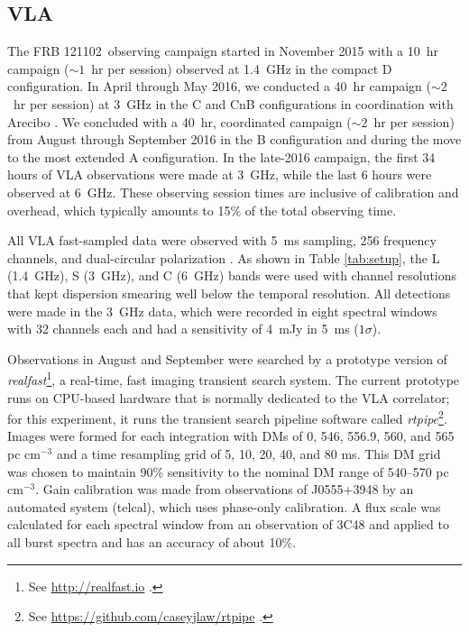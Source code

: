 \documentclass[twocolumn]{aastex61}
\newcommand{\frb}{FRB 121102}
\begin{document}
\subsection{VLA}

The \frb\ observing campaign started in November 2015 with a 10~hr campaign ($\sim1$~hr per session) observed at 1.4~GHz in the compact D configuration. In April through May 2016, we conducted a 40~hr campaign ($\sim2$~hr per session) at 3~GHz in the C and CnB configurations in coordination with Arecibo \citep{2016arXiv160308880S}. We concluded with a 40~hr, coordinated campaign ($\sim2$~hr per session) from August through September 2016 in the B configuration and during the move to the most extended A configuration. In the late-2016 campaign, the first 34 hours of VLA observations were made at 3~GHz, while the last 6 hours were observed at 6~GHz. These observing session times are inclusive of calibration and overhead, which typically amounts to 15\% of the total observing time.

All VLA fast-sampled data were observed with 5~ms sampling, 256 frequency channels, and dual-circular polarization \citep{2015ApJ...807...16L}. As shown in Table \ref{tab:setup}, the L (1.4~GHz), S (3~GHz), and C (6~GHz) bands were used with channel resolutions that kept dispersion smearing well below the temporal resolution. All detections were made in the 3~GHz data, which were recorded in eight spectral windows with 32 channels each and had a sensitivity of 4~mJy in 5~ms ($1\sigma$).

Observations in August and September were searched by a prototype version of \textit{realfast}\footnote{See \url{http://realfast.io} \citep{2017AAS...22933002L}.}, a real-time, fast imaging transient search system. The current prototype runs on CPU-based hardware that is normally dedicated to the VLA correlator; for this experiment, it runs the transient search pipeline software called \emph{rtpipe}\footnote{See \url{https://github.com/caseyjlaw/rtpipe} \citep{2015ApJ...807...16L}.}. Images were formed for each integration with DMs of 0, 546, 556.9, 560, and 565 pc cm$^{-3}$ and a time resampling grid of 5, 10, 20, 40, and 80 ms. This DM grid was chosen to maintain 90\% sensitivity to the nominal DM range of 540--570 pc cm$^{-3}$. Gain calibration was made from observations of J0555+3948 by an automated system (telcal), which uses phase-only calibration. A flux scale was calculated for each spectral window from an observation of 3C48 and applied to all burst spectra and has an accuracy of about 10\%.
\end{document}
